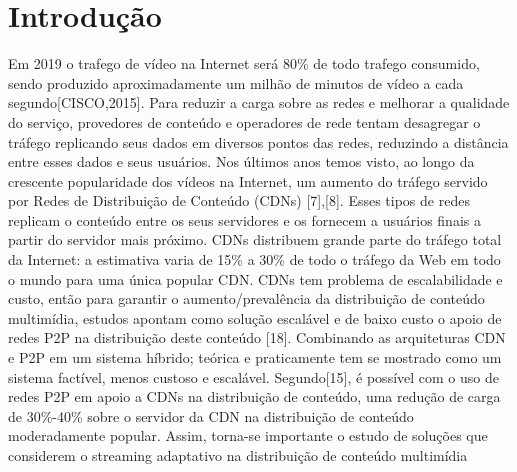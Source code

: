 \documentclass[
	12pt,				%
	oneside,			%
	a4paper,			%
	english,			%
	brazil				%
	]{abntex2ppgsi}
\begin{document}
\tableofcontents*
\cleardoublepage



\textual



% 
%
%
\chapter{Introdução}

Em 2019 o trafego de vídeo na Internet será 80\% de todo trafego consumido, sendo produzido aproximadamente um milhão de minutos de vídeo a cada segundo[CISCO,2015]. Para reduzir a carga sobre as redes e melhorar a qualidade do serviço, provedores de conteúdo e operadores de rede tentam desagregar o tráfego replicando seus dados em diversos pontos das redes, reduzindo a distância entre esses dados e seus usuários. Nos últimos anos temos visto, ao longo da crescente popularidade dos vídeos na Internet, um aumento do tráfego servido por Redes de Distribuição de Conteúdo (CDNs) [7],[8]. 
Esses tipos de redes replicam o conteúdo entre os seus servidores e os fornecem a usuários finais a partir do servidor mais próximo. CDNs distribuem grande parte do tráfego total da Internet: a estimativa varia de 15\% a 30\% de todo o tráfego da Web em todo o mundo para uma única popular CDN. 
CDNs tem problema de escalabilidade e custo, então para garantir o aumento/prevalência da distribuição de conteúdo multimídia, estudos apontam como solução escalável e de baixo custo o apoio de redes P2P na distribuição deste conteúdo [18].
Combinando as arquiteturas CDN e P2P em um sistema híbrido; teórica e praticamente tem se mostrado como um sistema factível, menos custoso e escalável. Segundo[15], é possível com o uso de redes P2P em apoio a CDNs na distribuição de conteúdo, uma redução de carga de 30\%-40\% sobre o servidor da CDN na distribuição de conteúdo moderadamente popular.
Assim, torna-se importante o estudo de soluções que considerem o streaming adaptativo na distribuição de conteúdo multimídia
\end{document}
